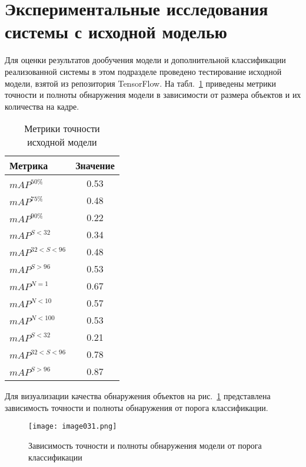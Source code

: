 \section{Экспериментальные исследования системы с исходной моделью}

Для оценки результатов дообучения модели и дополнительной классификации реализованной системы в этом подразделе проведено тестирование исходной модели, взятой из репозитория TensorFlow. На табл.~\ref{tabular:tab_exp_1} приведены метрики точности и полноты обнаружения модели в зависимости от размера объектов и их количества на кадре.

\begin{table}[H]
	\def\arraystretch{1.3}
	\caption{Метрики точности исходной модели}
	\begin{center}
		\begin{tabular}{|l|c|}
			\hline
			Метрика & Значение\\  \hline			
			\(mAP^{50\%}\) & 0.53\\ \hline			
			\(mAP^{75\%}\) & 0.48\\ \hline
			\(mAP^{90\%}\) & 0.22\\ \hline
			\(mAP^{S<32}\) & 0.34\\ \hline
			\(mAP^{32<S<96}\) & 0.48\\ \hline
			\(mAP^{S>96}\) & 0.53\\ \hline
			\(mAP^{N=1}\) & 0.67\\ \hline
			\(mAP^{N<10}\) & 0.57\\ \hline
			\(mAP^{N<100}\) & 0.53\\ \hline
			\(mAP^{S<32}\) & 0.21\\ \hline
			\(mAP^{32<S<96}\) & 0.78\\ \hline
			\(mAP^{S>96}\) & 0.87\\ \hline			
		\end{tabular}
		\label{tabular:tab_exp_1}
	\end{center}
\end{table}

Для визуализации качества обнаружения объектов на рис.~\ref{fig:image031} представлена зависимость точности и полноты обнаружения от порога классификации.

\begin{figure}[htbp]
\centering
\texttt{[image: image031.png]}
\caption{Зависимость точности и полноты обнаружения модели от порога классификации}%
\label{fig:image031}
\end{figure}

